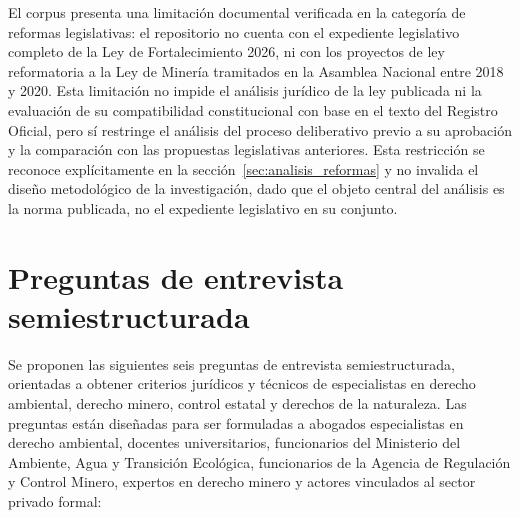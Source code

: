 El corpus presenta una limitación documental verificada en la categoría de reformas legislativas: el repositorio no cuenta con el expediente legislativo completo de la Ley de Fortalecimiento 2026, ni con los proyectos de ley reformatoria a la Ley de Minería tramitados en la Asamblea Nacional entre 2018 y 2020. Esta limitación no impide el análisis jurídico de la ley publicada ni la evaluación de su compatibilidad constitucional con base en el texto del Registro Oficial, pero sí restringe el análisis del proceso deliberativo previo a su aprobación y la comparación con las propuestas legislativas anteriores. Esta restricción se reconoce explícitamente en la sección~\ref{sec:analisis_reformas} y no invalida el diseño metodológico de la investigación, dado que el objeto central del análisis es la norma publicada, no el expediente legislativo en su conjunto.

\section{Preguntas de entrevista semiestructurada}
\label{sec:preguntas_entrevista}

Se proponen las siguientes seis preguntas de entrevista semiestructurada, orientadas a obtener criterios jurídicos y técnicos de especialistas en derecho ambiental, derecho minero, control estatal y derechos de la naturaleza. Las preguntas están diseñadas para ser formuladas a abogados especialistas en derecho ambiental, docentes universitarios, funcionarios del Ministerio del Ambiente, Agua y Transición Ecológica, funcionarios de la Agencia de Regulación y Control Minero, expertos en derecho minero y actores vinculados al sector privado formal:

